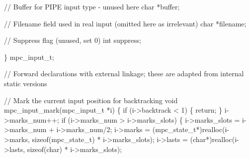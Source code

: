 \documentclass[
  a4paper,
]{scrreprt}
\newenvironment{Shaded}{\begin{snugshade}}{\end{snugshade}}
\newcommand{\CommentTok}[1]{\textcolor[rgb]{0.41,0.41,0.41}{#1}}
\newcommand{\ControlFlowTok}[1]{\textcolor[rgb]{0.85,0.12,0.09}{#1}}
\newcommand{\DataTypeTok}[1]{\textcolor[rgb]{0.47,0.16,0.63}{#1}}
\newcommand{\DecValTok}[1]{\textcolor[rgb]{0.47,0.16,0.63}{#1}}
\newcommand{\KeywordTok}[1]{\textcolor[rgb]{0.85,0.12,0.09}{#1}}
\newcommand{\NormalTok}[1]{\textcolor[rgb]{0.33,0.33,0.33}{#1}}
\newcommand{\OperatorTok}[1]{\textcolor[rgb]{0.00,0.46,0.62}{#1}}
\theoremstyle{definition}
\theoremstyle{remark}
\begin{document}
\begin{Shaded}
\begin{Highlighting}[numbers=left,,]
  \CommentTok{// Buffer for PIPE input type {-} unused here}
  \DataTypeTok{char} \OperatorTok{*}\NormalTok{buffer}\OperatorTok{;}

  \CommentTok{// Filename field used in real input (omitted here as irrelevant)}
  \DataTypeTok{char} \OperatorTok{*}\NormalTok{filename}\OperatorTok{;}

  \CommentTok{// Suppress flag (unused, set 0)}
  \DataTypeTok{int}\NormalTok{ suppress}\OperatorTok{;}

\OperatorTok{\}}\NormalTok{ mpc\_input\_t}\OperatorTok{;}

\CommentTok{// Forward declarations with external linkage; these are adapted from internal static versions}

\CommentTok{// Mark the current input position for backtracking}
\DataTypeTok{void}\NormalTok{ mpc\_input\_mark}\OperatorTok{(}\NormalTok{mpc\_input\_t }\OperatorTok{*}\NormalTok{i}\OperatorTok{)} \OperatorTok{\{}
  \ControlFlowTok{if} \OperatorTok{(}\NormalTok{i}\OperatorTok{{-}\textgreater{}}\NormalTok{backtrack }\OperatorTok{\textless{}} \DecValTok{1}\OperatorTok{)} \OperatorTok{\{} \ControlFlowTok{return}\OperatorTok{;} \OperatorTok{\}}
\NormalTok{  i}\OperatorTok{{-}\textgreater{}}\NormalTok{marks\_num}\OperatorTok{++;}
  \ControlFlowTok{if} \OperatorTok{(}\NormalTok{i}\OperatorTok{{-}\textgreater{}}\NormalTok{marks\_num }\OperatorTok{\textgreater{}}\NormalTok{ i}\OperatorTok{{-}\textgreater{}}\NormalTok{marks\_slots}\OperatorTok{)} \OperatorTok{\{}
\NormalTok{    i}\OperatorTok{{-}\textgreater{}}\NormalTok{marks\_slots }\OperatorTok{=}\NormalTok{ i}\OperatorTok{{-}\textgreater{}}\NormalTok{marks\_num }\OperatorTok{+}\NormalTok{ i}\OperatorTok{{-}\textgreater{}}\NormalTok{marks\_num}\OperatorTok{/}\DecValTok{2}\OperatorTok{;}
\NormalTok{    i}\OperatorTok{{-}\textgreater{}}\NormalTok{marks }\OperatorTok{=} \OperatorTok{(}\NormalTok{mpc\_state\_t}\OperatorTok{*)}\NormalTok{realloc}\OperatorTok{(}\NormalTok{i}\OperatorTok{{-}\textgreater{}}\NormalTok{marks}\OperatorTok{,} \KeywordTok{sizeof}\OperatorTok{(}\NormalTok{mpc\_state\_t}\OperatorTok{)} \OperatorTok{*}\NormalTok{ i}\OperatorTok{{-}\textgreater{}}\NormalTok{marks\_slots}\OperatorTok{);}
\NormalTok{    i}\OperatorTok{{-}\textgreater{}}\NormalTok{lasts }\OperatorTok{=} \OperatorTok{(}\DataTypeTok{char}\OperatorTok{*)}\NormalTok{realloc}\OperatorTok{(}\NormalTok{i}\OperatorTok{{-}\textgreater{}}\NormalTok{lasts}\OperatorTok{,} \KeywordTok{sizeof}\OperatorTok{(}\DataTypeTok{char}\OperatorTok{)} \OperatorTok{*}\NormalTok{ i}\OperatorTok{{-}\textgreater{}}\NormalTok{marks\_slots}\OperatorTok{);}

\end{Highlighting}
\end{Shaded}
\end{document}
